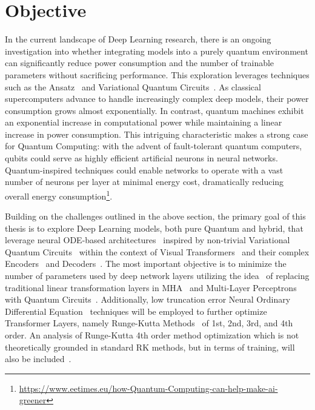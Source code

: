 \documentclass[12pt,a4paper]{report}
\begin{document}
\section{Objective}\vspace{-12pt}
In the current landscape of Deep Learning research, there is an ongoing investigation into whether integrating models into a purely quantum environment can significantly reduce power consumption and the number of trainable parameters without sacrificing performance. This exploration leverages techniques such as the Ansatz~\cite{hadfield2019Quantum} and Variational Quantum Circuits~\cite{cerezo2021variational}. As classical supercomputers advance to handle increasingly complex deep models, their power consumption grows almost exponentially. In contrast, quantum machines exhibit an exponential increase in computational power while maintaining a linear increase in power consumption. This intriguing characteristic makes a strong case for Quantum Computing: with the advent of fault-tolerant quantum computers, qubits could serve as highly efficient artificial neurons in neural networks. Quantum-inspired techniques could enable networks to operate with a vast number of neurons per layer at minimal energy cost, dramatically reducing overall energy consumption\footnote{\url{https://www.eetimes.eu/how-Quantum-Computing-can-help-make-ai-greener}}.

Building on the challenges outlined in the above section, the primary goal of this thesis is to explore Deep Learning models, both pure Quantum and hybrid, that leverage neural ODE-based architectures~\cite{zhong2022neural} inspired by non-trivial Variational Quantum Circuits~\cite{cerezo2021variational} within the context of Visual Transformers~\cite{vaswani2017attention, dosovitskiy2020} and their complex Encoders~\cite{hinton2011transforming} and Decoders~\cite{breuckmann2018scalable}. The most important objective is to minimize the number of parameters used by deep network layers utilizing the idea~\cite{Comajoan_Cara_2024} of replacing traditional linear transformation layers in MHA~\cite{voita2019analyzing} and Multi-Layer Perceptrons~\cite{popescu2009multilayer} with Quantum Circuits~\cite{benedetti2019parameterized}. Additionally, low truncation error Neural Ordinary Differential Equation~\cite{zhong2022neural}\cite{li2022ode} techniques will be employed to further optimize Transformer Layers, namely Runge-Kutta Methods~\cite{butcher1996history} of 1st, 2nd, 3rd, and 4th order. An analysis of Runge-Kutta 4th order method optimization which is not theoretically grounded in standard RK methods, but in terms of training, will also be included~\cite{li2022ode}.
\end{document}

